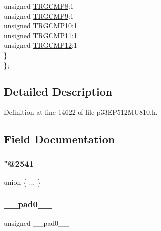 \begin{DoxyCompactItemize}
\begin{tabbing}
\>\>unsigned \hyperlink{structtag_t_r_i_g3_b_i_t_s_a7d4f3ec40334f00592eb7247457e2fd6}{TRGCMP8}:1\\
\>\>unsigned \hyperlink{structtag_t_r_i_g3_b_i_t_s_a0001e7efb9031bef24e7a19100d11b0b}{TRGCMP9}:1\\
\>\>unsigned \hyperlink{structtag_t_r_i_g3_b_i_t_s_a768e63198a56962df16bcaaf9084f379}{TRGCMP10}:1\\
\>\>unsigned \hyperlink{structtag_t_r_i_g3_b_i_t_s_a8a82ad80802491f065113055f2a059e2}{TRGCMP11}:1\\
\>\>unsigned \hyperlink{structtag_t_r_i_g3_b_i_t_s_a2bc8969a57c3dbec6828f3bda9ebc1fd}{TRGCMP12}:1\\
\>\} \\
\}; \\

\end{tabbing}\end{DoxyCompactItemize}


\subsection{Detailed Description}


Definition at line 14622 of file p33\+E\+P512\+M\+U810.\+h.



\subsection{Field Documentation}
\mbox{\label{structtag_t_r_i_g3_b_i_t_s_a584fec0f23cd34470f6ea24b57886f83}} 
\subsubsection{\texorpdfstring{"@2541}{@2541}}
{\footnotesize\ttfamily union \{ ... \} }

\mbox{\label{structtag_t_r_i_g3_b_i_t_s_adf71f3d8410c1f1dbbc96680a92c49af}} 
\subsubsection{\texorpdfstring{\+\_\+\+\_\+pad0\+\_\+\+\_\+}{\_\_pad0\_\_}}
{\footnotesize\ttfamily unsigned \+\_\+\+\_\+pad0\+\_\+\+\_\+}



